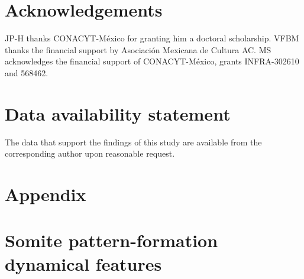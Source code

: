 \documentclass[%
 preprint,
 aip, 
 amsmath,amssymb,
]{revtex4-2}
\begin{document}
	
\section*{Acknowledgements}

JP-H thanks CONACYT-México for granting him a doctoral scholarship. VFBM thanks the financial support by Asociación Mexicana de Cultura AC. MS acknowledges the financial support of CONACYT-México, grants INFRA-302610 and 568462. 

\section*{Data availability statement}


The data that support the findings of this study are available from the corresponding author upon reasonable request.
	
	
	\appendix
	
	\section*{Appendix}
	\section{Somite pattern-formation dynamical features}
	\label{app:bif}
\end{document}
